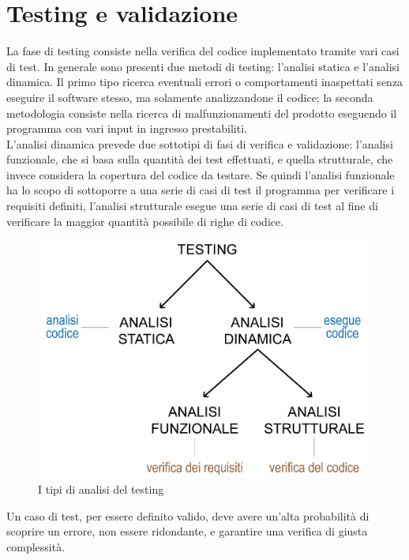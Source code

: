 \chapter{Testing e validazione}
\label{cha:test}
La fase di testing consiste nella verifica del codice implementato tramite vari casi di test. In generale sono presenti due metodi di testing: l'analisi statica e l'analisi dinamica. Il primo tipo ricerca eventuali errori o comportamenti inaspettati senza eseguire il software stesso, ma solamente analizzandone il codice; la seconda metodologia consiste nella ricerca di malfunzionamenti del prodotto eseguendo il programma con vari input in ingresso prestabiliti. \\
L'analisi dinamica prevede due sottotipi di fasi di verifica e validazione: l'analisi funzionale, che si basa sulla quantità dei test effettuati, e quella strutturale, che invece considera la copertura del codice da testare.
Se quindi l'analisi funzionale ha lo scopo di sottoporre a una serie di casi di test il programma per verificare i requisiti definiti, l'analisi strutturale esegue una serie di casi di test al fine di verificare la maggior quantità possibile di righe di codice.\\

\begin{figure}[!hbt]
\centering
\includegraphics[scale=0.55]{img/testing.png}
\caption{I tipi di analisi del testing}
\label{fig:testing}
\end{figure}
\noindent
\newline
Un caso di test, per essere definito valido, deve avere un’alta probabilità di scoprire un errore, non essere ridondante, e garantire una verifica di giusta complessità.\\




